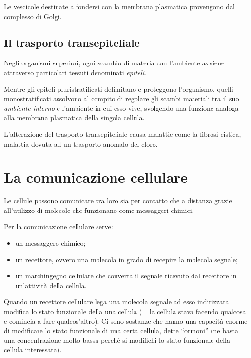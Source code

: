 \documentclass[]{article}
\begin{document}
Le vescicole destinate a fondersi con la membrana plasmatica provengono
dal complesso di Golgi.

\subsection{Il trasporto
transepiteliale}\label{il-trasporto-transepiteliale}

Negli organismi superiori, ogni scambio di materia con l'ambiente
avviene attraverso particolari tessuti denominati \emph{epiteli}.

Mentre gli epiteli pluristratificati delimitano e proteggono
l'organismo, quelli monostratificati assolvono al compito di regolare
gli scambi materiali tra il suo \emph{ambiente interno} e l'ambiente in
cui esso vive, svolgendo una funzione analoga alla membrana plasmatica
della singola cellula.

L'alterazione del trasporto transepiteliale causa malattie come la
fibrosi cistica, malattia dovuta ad un trasporto anomalo del cloro.

\section{La comunicazione cellulare}\label{la-comunicazione-cellulare}

Le cellule possono comunicare tra loro sia per contatto che a distanza
grazie all'utilizzo di molecole che funzionano come messaggeri chimici.

Per la comunicazione cellulare serve:

\begin{itemize}
\itemsep1pt\parskip0pt
\item
  un messaggero chimico;
\item
  un recettore, ovvero una molecola in grado di recepire la molecola
  segnale;
\item
  un marchingegno cellulare che converta il segnale ricevuto dal
  recettore in un'attività della cellula.
\end{itemize}

Quando un recettore cellulare lega una molecola segnale ad esso
indirizzata modifica lo stato funzionale della una cellula (= la cellula
stava facendo qualcosa e comincia a fare qualcos'altro). Ci sono
sostanze che hanno una capacità enorme di modificare lo stato funzionale
di una certa cellula, dette ``ormoni'' (ne basta una concentrazione
molto bassa perché si modifichi lo stato funzionale della cellula
interessata).
\end{document}
